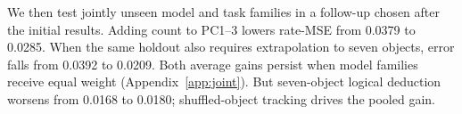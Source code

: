 We then test jointly unseen model and task families in a follow-up chosen after the initial results. Adding count to PC1--3 lowers rate-MSE from 0.0379 to 0.0285. When the same holdout also requires extrapolation to seven objects, error falls from 0.0392 to 0.0209. Both average gains persist when model families receive equal weight (Appendix~\ref{app:joint}). But seven-object logical deduction worsens from 0.0168 to 0.0180; shuffled-object tracking drives the pooled gain.
